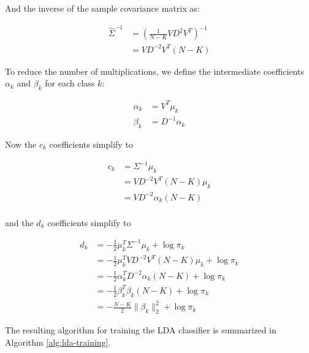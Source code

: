 And the inverse of the sample covariance matrix as:

\begin{align*}
\hat{\Sigma}^{-1} &= \left( \frac{1}{N-K} VD^{2}V^{T} \right)^{-1} \\
& = VD^{-2}V^{T} (N-K)
\end{align*}

To reduce the number of multiplications, we define the intermediate coefficients $\alpha_k$ and $\beta_k$ for each class $k$:


\begin{align*}
\alpha_{k} & = V^{T} \mu_{k}  \\
\beta_{k} &= D^{-1}\alpha_{k}
\end{align*}

Now the $c_{k}$ coefficients simplify to

\begin{align*}
c_{k} &= \Sigma^{-1} \mu_{k} \\
&= VD^{-2}V^{T} (N-K) \mu_{k} \\
&= VD^{-2} \alpha_{k} (N-K) \\
\end{align*}

and the $d_{k}$ coefficients simplify to

\begin{align*}
d_{k} &= -\frac{1}{2} \mu_{k}^{T} \Sigma^{-1} \mu_{k} + \log \pi_{k} \\
&= -\frac{1}{2} \mu_{k}^{T} VD^{-2}V^{T} (N-K) \mu_{k} + \log \pi_{k} \\
&= -\frac{1}{2} \alpha_{k}^{T} D^{-2} \alpha_{k} (N-K) + \log \pi_{k}  \\
&= -\frac{1}{2} \beta_{k}^{T} \beta_{k} (N-K) + \log \pi_{k} \\
& = - \frac{N-K}{2} \| \beta_{k} \|^2_{2} + \log \pi_{k}
\end{align*}

The resulting algorithm for training the LDA classifier is summarized in Algorithm \ref{alg:lda-training}.

